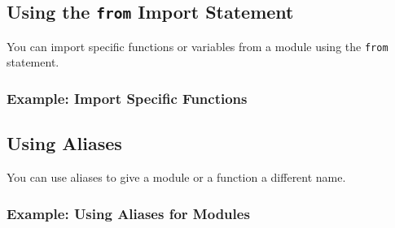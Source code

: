 \documentclass[
  letterpaper,
  DIV=11,
  numbers=noendperiod]{scrreprt}
\newenvironment{Shaded}{\begin{snugshade}}{\end{snugshade}}
\newcommand{\BuiltInTok}[1]{\textcolor[rgb]{0.00,0.23,0.31}{#1}}
\newcommand{\DecValTok}[1]{\textcolor[rgb]{0.68,0.00,0.00}{#1}}
\newcommand{\ImportTok}[1]{\textcolor[rgb]{0.00,0.46,0.62}{#1}}
\newcommand{\NormalTok}[1]{\textcolor[rgb]{0.00,0.23,0.31}{#1}}
\newcommand{\OperatorTok}[1]{\textcolor[rgb]{0.37,0.37,0.37}{#1}}
\newcommand{\SpecialCharTok}[1]{\textcolor[rgb]{0.37,0.37,0.37}{#1}}
\newcommand{\SpecialStringTok}[1]{\textcolor[rgb]{0.13,0.47,0.30}{#1}}
\begin{document}
\subsection{\texorpdfstring{Using the \texttt{from} Import
Statement}{Using the from Import Statement}}\label{using-the-from-import-statement}

You can import specific functions or variables from a module using the
\texttt{from} statement.

\subsubsection{Example: Import Specific
Functions}\label{example-import-specific-functions}

\begin{Shaded}
\end{Shaded}

\subsection{Using Aliases}\label{using-aliases}

You can use aliases to give a module or a function a different name.

\subsubsection{Example: Using Aliases for
Modules}\label{example-using-aliases-for-modules}
\end{document}
